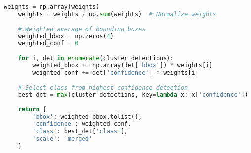 \documentclass[12pt,a4paper]{report}
\begin{document}
\begin{lstlisting}[language=Python, caption=Advanced Detection Merging Algorithm]
    weights = np.array(weights)
    weights = weights / np.sum(weights)  # Normalize weights
    
    # Weighted average of bounding boxes
    weighted_bbox = np.zeros(4)
    weighted_conf = 0
    
    for i, det in enumerate(cluster_detections):
        weighted_bbox += np.array(det['bbox']) * weights[i]
        weighted_conf += det['confidence'] * weights[i]
    
    # Select class from highest confidence detection
    best_det = max(cluster_detections, key=lambda x: x['confidence'])
    
    return {
        'bbox': weighted_bbox.tolist(),
        'confidence': weighted_conf,
        'class': best_det['class'],
        'scale': 'merged'
    }
\end{lstlisting}
\end{document}
